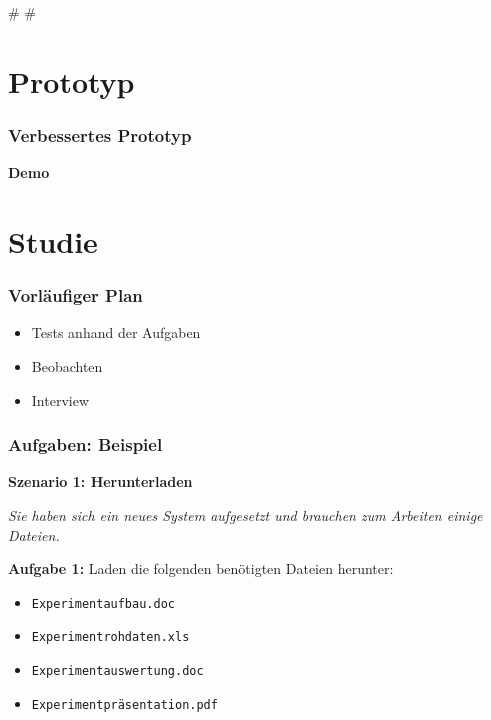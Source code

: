 
\def\mytitle{File Network: Prototyp und Planung des Usabilitytests}
\def\myauthor{Anastasia Kazakova, Bengt Lüers}
\def\latexmode{beamer}
\def\latexxslt{beamer}
\def\theme{keynote-IntSysTheme}

\def\bibliostyle{chicago}

\# \#

\section{Prototyp}
\label{prototyp}

\begin{frame}

\frametitle{Verbessertes Prototyp}
\label{verbessertesprototyp}

\textbf{Demo}

\end{frame}

\section{Studie}
\label{studie}

\begin{frame}

\frametitle{Vorläufiger Plan}
\label{vorlufigerplan}

\begin{itemize}
\item Tests anhand der Aufgaben

\item Beobachten

\item Interview

\end{itemize}

\end{frame}

\begin{frame}

\frametitle{Aufgaben: Beispiel}
\label{aufgaben:beispiel}

\textbf{Szenario 1: Herunterladen}

\emph{Sie haben sich ein neues System aufgesetzt und brauchen zum Arbeiten einige Dateien.}

\textbf{Aufgabe 1:} Laden die folgenden benötigten Dateien herunter:

\begin{itemize}
\item \texttt{Experimentaufbau.doc}

\item \texttt{Experimentrohdaten.xls}

\item \texttt{Experimentauswertung.doc}

\item \texttt{Experimentpräsentation.pdf}

\end{itemize}

\end{frame}

